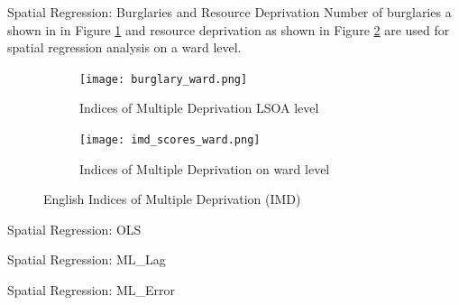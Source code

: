 \documentclass[10pt, aspectratio=169]{beamer}
\begin{document}
\begin{frame}{Spatial Regression: Burglaries and Resource Deprivation}
    Number of burglaries a shown in in Figure \ref{fig:burglary_ward} and resource deprivation as shown 
    in Figure \ref{fig:imd_scores_ward} are used for spatial regression analysis on a ward level.
    \begin{figure}
        \centering
            \begin{subfigure}[t]{0.4\textwidth}
                \texttt{[image: burglary\_ward.png]}
                \caption{Indices of Multiple Deprivation LSOA level}\label{fig:burglary_ward}
            \end{subfigure}
            \begin{subfigure}[t]{0.4\textwidth}
                \texttt{[image: imd\_scores\_ward.png]}
                \caption{Indices of Multiple Deprivation on ward level}\label{fig:imd_scores_ward}
            \end{subfigure}
        \caption{English Indices of Multiple Deprivation (IMD)}\label{fig:burg_imd}
    \end{figure}
\end{frame}

                
\begin{frame}{Spatial Regression: OLS}
    \small\begin{table}[!h]
        
        \caption{\label{tab:ols_summary} Estimation results of OLS regression.}
    \end{table}
\end{frame}

\begin{frame}{Spatial Regression: ML\_Lag}
    \small\begin{table}[!h]
        
        \caption{\label{tab:ml_lag_summary} Estimation results of ML\_Lag regression.}
    \end{table}
\end{frame}

\begin{frame}{Spatial Regression: ML\_Error}
    \small\begin{table}[!h]
        
        \caption{\label{tab:ml_error_summary} Estimation results of ML\_Error regression.}
    \end{table}
\end{frame}
\end{document}

